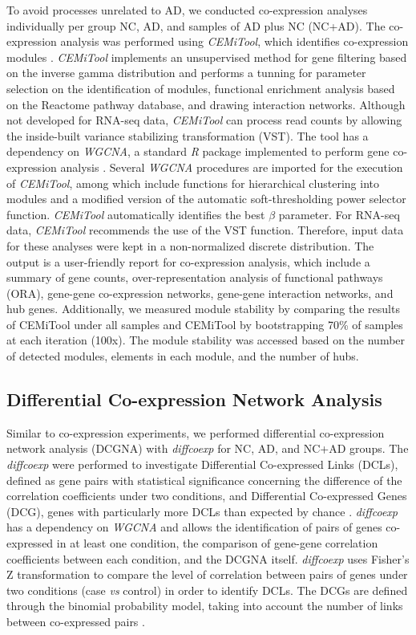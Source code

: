 \documentclass[utf8]{FrontiersinHarvard} %
\begin{document}
To avoid processes unrelated to AD, we conducted co-expression analyses individually per group NC, AD, and samples of AD plus NC (NC+AD). The co-expression analysis was performed using \textit{CEMiTool}, which identifies co-expression modules \citep{russo2018cemitool}. \textit{CEMiTool} implements an unsupervised method for gene filtering based on the inverse gamma distribution and performs a tunning for parameter selection on the identification of modules, functional enrichment analysis based on the Reactome pathway database, and drawing interaction networks. Although not developed for RNA-seq data, \textit{CEMiTool} can process read counts by allowing the inside-built variance stabilizing transformation (VST). The tool has a dependency on \textit{WGCNA}, a standard \textit{R} package implemented to perform gene co-expression analysis \citep{langfelder2008wgcna}. Several \textit{WGCNA} procedures are imported for the execution of \textit{CEMiTool}, among which include functions for hierarchical clustering into modules and a modified version of the automatic soft-thresholding power selector function. \textit{CEMiTool} automatically identifies the best $\beta$ parameter. For RNA-seq data, \textit{CEMiTool} recommends the use of the VST function. Therefore, input data for these analyses were kept in a non-normalized discrete distribution. The output is a user-friendly report for co-expression analysis, which include a summary of gene counts, over-representation analysis of functional pathways (ORA), gene-gene co-expression networks, gene-gene interaction networks, and hub genes. Additionally, we measured module stability by comparing the results of CEMiTool under all samples and CEMiTool by bootstrapping 70\% of samples at each iteration (100x). The module stability was accessed based on the number of detected modules, elements in each module, and the number of hubs.

\subsection{Differential Co-expression Network Analysis}

Similar to co-expression experiments, we performed differential co-expression network analysis (DCGNA) with \textit{diffcoexp} for NC, AD, and NC+AD groups. The \textit{diffcoexp} were performed to investigate Differential Co-expressed Links (DCLs), defined as gene pairs with statistical significance concerning the difference of the correlation coefficients under two conditions, and Differential Co-expressed Genes (DCG), genes with particularly more DCLs than expected by chance \citep{wei2018diffcoexp}. \textit{diffcoexp} has a dependency on \textit{WGCNA} and allows the identification of pairs of genes co-expressed in at least one condition, the comparison of gene-gene correlation coefficients between each condition, and the DCGNA itself. \textit{diffcoexp} uses Fisher's Z transformation to compare the level of correlation between pairs of genes under two conditions (case \textit{vs} control) in order to identify DCLs. The DCGs are defined through the binomial probability model, taking into account the number of links between co-expressed pairs \citep{jiang2016differential}.
\end{document}
